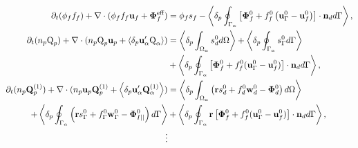 \begin{align}
    \pddt (\phi_f f_f)
    +\div (\phi_f f_f \textbf{u}_f + \mathbf{\Phi}_f^\text{eff})
    &= 
    \phi_f s_f
    - \pSavg{\left[
        \mathbf{\Phi}_f^0
        + f_f^0
        \left(
            \textbf{u}_\Gamma^0
            - \textbf{u}_f^0
        \right)
    \right]
    \cdot \textbf{n}_d} ,
    \label{eq:avg_hybrid_dt_chi_f}\\
        \pddt (n_p\text Q_p)
        + \div (n_p \text Q_p \textbf{u}_p + \pavg{\textbf{u}_\alpha' \text Q_\alpha})
        &= \pOavg{ s_d^0 }
        + \pSavg{ s_\Gamma^0 }\nonumber\\
        &+ \pSavg{ \left[\mathbf{\Phi}_f^0 + f_f^0 (\textbf{u}_\Gamma^0-\textbf{u}_f^0) \right] \cdot \textbf{n}_d },
        \label{eq:avg_hybrid_q}
        \\
        \pddt (n_p\textbf{Q}_p^{(1)})
        + \div (n_p  \textbf{u}_p  \textbf{Q}_p^{(1)}+ \pavg{\textbf{u}_\alpha' \textbf{Q}_\alpha^{(1)}})
        &=\pOavg{ \left(
            \textbf{r} s_d^0         
            + f_d^0  \textbf{w}_d^0 
            - \mathbf{\Phi}_d^0
        \right) }\nonumber\\
        + \pSavg{ \left(
            \textbf{r}s_\Gamma^0
            + f_\Gamma^0 \textbf{w}_\Gamma^0
            - \mathbf{\Phi}_{I||}^0
        \right) }
        &+ \pSavg{ \textbf{r} \left[
            \mathbf{\Phi}_f^0
            + f_f^0 (\textbf{u}_\Gamma^0-\textbf{u}_f^0)
        \right]\cdot \textbf{n}_d  },
        \label{eq:avg_hybrid_q_1}
        \\\nonumber
        \vdots
\end{align}

